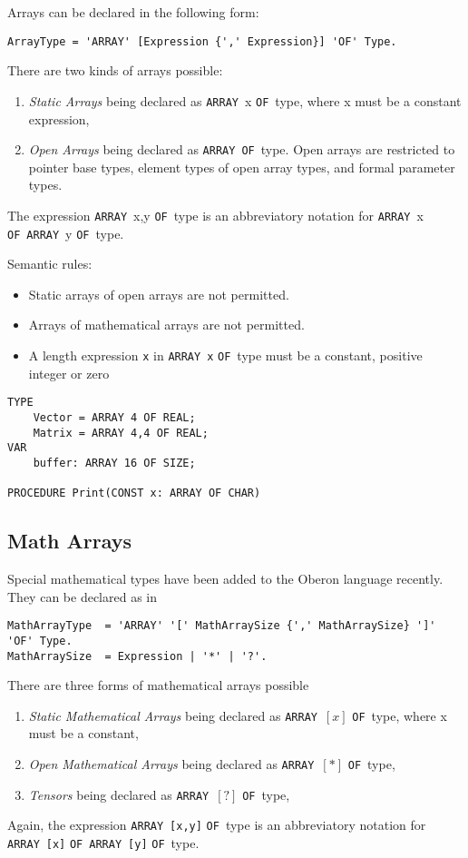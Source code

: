 \documentclass[a4wide,11pt]{article}
\newcommand{\ARRAY}{\lstinline"ARRAY"}
\newcommand{\OF}{\lstinline"OF"}
\begin{document}
Arrays can be declared in the following form:
\begin{lstlisting}[language = ebnf]
ArrayType = 'ARRAY' [Expression {',' Expression}] 'OF' Type.
\end{lstlisting}

There are two kinds of arrays possible:
\begin{enumerate}
\renewcommand{\labelenumi}{(\alph{enumi})}
\item \emph{Static Arrays} being declared as \ARRAY\ x \OF\ type, where x must be a constant expression,
\item \emph{Open Arrays} being declared as \ARRAY\ \OF\ type.
Open arrays are restricted to pointer base types, element types of open array types, and formal parameter types.
\end{enumerate}
The expression \ARRAY\ x,y \OF\ type is an abbreviatory notation for \ARRAY\ x \OF\ \ARRAY\ y \OF\ type.

Semantic rules:
\begin{itemize}
\item Static arrays of open arrays are not permitted.
\item Arrays of mathematical arrays are not permitted.
\item A length expression \verb~x~ in \ARRAY\ \verb~x~ \OF\ type must be a constant, positive integer or zero
\end{itemize}

\begin{lstlisting}[style=example]
TYPE
	Vector = ARRAY 4 OF REAL;
	Matrix = ARRAY 4,4 OF REAL;
VAR
	buffer: ARRAY 16 OF SIZE;

PROCEDURE Print(CONST x: ARRAY OF CHAR)
\end{lstlisting}

\subsection{Math Arrays}

Special mathematical types have been added to the Oberon language recently.
They can be declared as in
\begin{lstlisting}[style = ebnf]
MathArrayType  = 'ARRAY' '[' MathArraySize {',' MathArraySize} ']' 'OF' Type.
MathArraySize  = Expression | '*' | '?'.
\end{lstlisting}

There are three forms of mathematical arrays possible
\begin{enumerate}
\renewcommand{\labelenumi}{(\alph{enumi})}
\item \emph{Static Mathematical Arrays} being declared as \ARRAY\ $[x]$ \OF\ type, where x must be a constant,
\item \emph{Open Mathematical Arrays} being declared as \ARRAY\ $[*]$ \OF\ type,
\item \emph{Tensors} being declared as \ARRAY\ $[?]$ \OF\ type,
\end{enumerate}
Again, the expression \ARRAY\ \verb~[x,y]~ \OF\ type is an abbreviatory notation for \ARRAY\ \verb~[x]~ \OF\ \ARRAY\ \verb~[y]~ \OF\ type.
\end{document}
